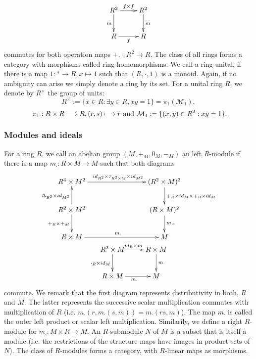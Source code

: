 $$\xymatrix{
R^2 \ar[r]^{f \times f} \ar[d]_m & R^2\ar[d]^m\\
R \ar[r]_{f}&R\\
}$$
commutes for both operation maps $+, \cdot : R^2 \longrightarrow R$. The class of all rings forms a category with morphisms called ring homomorphisms. We call a ring unital, if there is a map $1 : \ast \longrightarrow R, x \longmapsto 1$ such that $(R,\cdot,1)$ is a monoid. Again, if no ambiguity can arise we simply denote a ring by its set. For a unital ring $R$, we denote by $R^\times$ the group of units:
$$R^\times := \{x \in R : \exists y \in R, x y = 1\} = \pi_1(\mathcal{M}_1),$$
$$\ \pi_1 : R \times R \longrightarrow R, (r,s) \longmapsto r\ \mathrm{and}\ \mathcal{M}_1 := \{(x,y) \in R^2 : x y = 1\}.$$
\subsubsection{Modules and ideals}
\indent For a ring $R$, we call an abelian group $(M,+_M,0_M,-_M)$ an left $R$-module if there is a map 
$m_\cdot : R \times M \longrightarrow M$ such that both diagrams
$$\bao{c}
\xymatrix{
R^4 \times M^2 \ar[rrr]^{id_{R^2} \times \tau_{R^2 \times M} \times id_{M^2}}& && (R^2 \times M)^2 \ar[d]^{+_R \times id_M \times +_R \times id_M}\\
R^2 \times M^2 \ar[d]_{+_R \times +_M} \ar[u]^{\Delta_{R^2} \times id_{M^2}} &&&(R \times M)^2\ar[d]^{m_+}\\
R\times M\ar[rrr]^{m_\cdot}&&&M\\
}\\
\xymatrix{
R^2 \times M \ar[r]^{id_R \times m_\cdot} \ar[d]_{\cdot_R \times id_M} & R \times M\ar[d]^{m_\cdot}\\
R \times M \ar[r]_{m_\cdot} &M\\
}
\ea$$
commute. We remark that the first diagram represents distributivity in both, $R$ and $M$. The latter represents the successive scalar multiplication commutes with multiplication of $R$ (i.e. $m_\cdot(r,m_\cdot(s,m)) = m_\cdot(rs, m)$). The map $m_\cdot$ is called the outer left product or scalar left multiplication. Similarily, we define a right $R$-module for $m_\cdot : M \times R \longrightarrow M$. An $R$-submodule $N$ of $M$ is a subset that is itself a module (i.e. the restrictions of the structure maps have images in product sets of $N$). The class of $R$-modules forms a category, with $R$-linear maps as morphisms.
